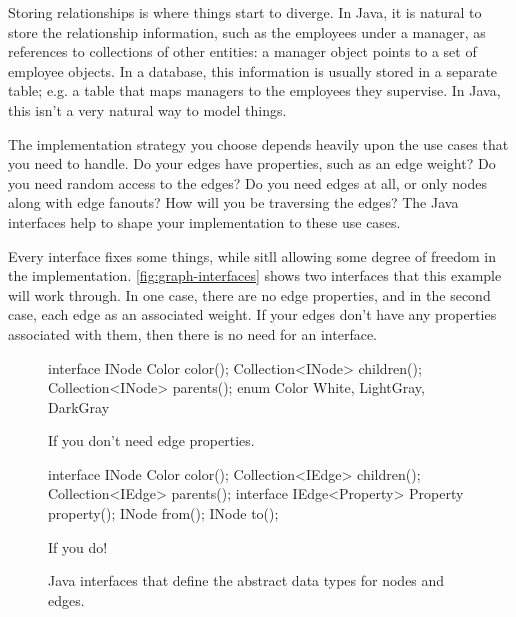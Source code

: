Storing relationships is where things start to diverge. In Java, it is natural
to store the relationship information, such as the employees under a manager, as
references to collections of other entities: a manager object points to a set of
employee objects. In a database, this information is usually stored in a
separate table; e.g. a table that maps managers to the employees they supervise.
In Java, this isn't a very natural way to model things.

The implementation strategy you choose depends heavily upon the use cases that
you need to handle. Do your edges have properties, such as an edge weight? Do
you need random access to the edges? Do you need edges at all, or only nodes
along with edge fanouts? How will you be traversing the edges? The Java
interfaces help to shape your implementation to these use cases.

Every interface fixes some things, while sitll allowing some degree of freedom
in the implementation. \autoref{fig:graph-interfaces} shows two interfaces that
this example will work through. In one case, there are no edge properties, and
in the second case, each edge as an associated weight. If your edges don't have
any properties associated with them, then there is no need for an 
interface. 

\begin{figure}
\centering
\begin{subfloat}
\label{fig:graph-interfaces}
\begin{minipage}[b]{0.45\textwidth}
\begin{framedlisting}
interface INode {
  Color color();
  Collection<INode> children();
  Collection<INode> parents();
}
enum Color {
  White, LightGray, DarkGray
}
\end{framedlisting}
\end{minipage}
\caption{If you don't need edge properties.}
\end{subfloat}
\begin{subfloat}
\label{fig:graph-interfaces}
\begin{minipage}[b]{0.45\textwidth}
\begin{framedlisting}
interface INode {
  Color color();
  Collection<IEdge> children();
  Collection<IEdge> parents();
}
interface IEdge<Property> {
   Property property();
   INode from();
   INode to();
}
\end{framedlisting}
\end{minipage}
\caption{If you do!}
\end{subfloat}
\caption{Java interfaces that define the abstract data types for nodes and
edges.}
\label{fig:graph-interfaces}
\end{figure}

